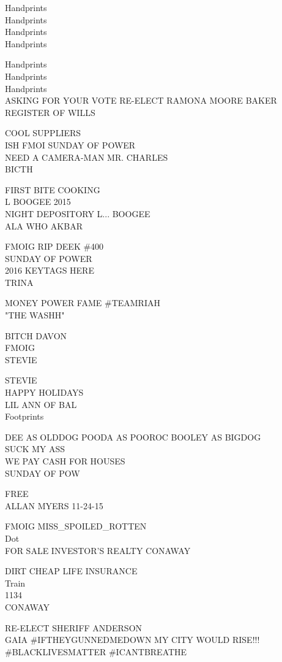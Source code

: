 \documentclass[10pt,letterpaper]{article}
\begin{document}
Handprints\\
Handprints\\
Handprints\\
Handprints

Handprints\\
Handprints\\
Handprints\\
ASKING FOR YOUR VOTE RE{-}ELECT RAMONA MOORE BAKER REGISTER OF WILLS

COOL SUPPLIERS\\
ISH FMOI SUNDAY OF POWER\\
NEED A CAMERA{-}MAN MR. CHARLES\\
BICTH

FIRST BITE COOKING\\
L BOOGEE 2015\\
NIGHT DEPOSITORY L... BOOGEE\\
ALA WHO AKBAR

FMOIG RIP DEEK \#400\\
SUNDAY OF POWER\\
2016 KEYTAGS HERE\\
TRINA

MONEY POWER FAME \#TEAMRIAH\\
"THE WASHH"

BITCH DAVON\\
FMOIG\\
STEVIE

STEVIE\\
HAPPY HOLIDAYS\\
LIL ANN OF BAL\\
Footprints

DEE AS OLDDOG POODA AS POOROC BOOLEY AS BIGDOG\\
SUCK MY ASS\\
WE PAY CASH FOR HOUSES\\
SUNDAY OF POW

FREE\\
ALLAN MYERS 11{-}24{-}15

FMOIG MISS\_SPOILED\_ROTTEN\\
Dot\\
FOR  SALE INVESTOR'S REALTY CONAWAY

DIRT CHEAP LIFE INSURANCE\\
Train\\
1134\\
CONAWAY

RE{-}ELECT SHERIFF ANDERSON\\
GAIA \#IFTHEYGUNNEDMEDOWN MY CITY WOULD RISE!!! \#BLACKLIVESMATTER \#ICANTBREATHE
\end{document}
